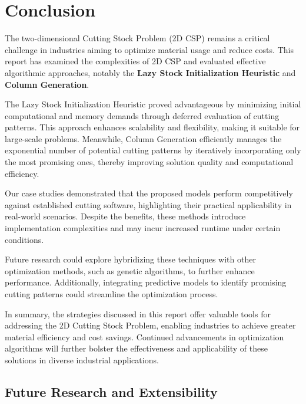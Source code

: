 \documentclass[a4paper]{article}
\begin{document}
\section{Conclusion}

The two-dimensional Cutting Stock Problem (2D CSP) remains a critical challenge in industries aiming to optimize material usage and reduce costs. This report has examined the complexities of 2D CSP and evaluated effective algorithmic approaches, notably the \textbf{Lazy Stock Initialization Heuristic} and \textbf{Column Generation}.

The Lazy Stock Initialization Heuristic proved advantageous by minimizing initial computational and memory demands through deferred evaluation of cutting patterns. This approach enhances scalability and flexibility, making it suitable for large-scale problems. Meanwhile, Column Generation efficiently manages the exponential number of potential cutting patterns by iteratively incorporating only the most promising ones, thereby improving solution quality and computational efficiency.

Our case studies demonstrated that the proposed models perform competitively against established cutting software, highlighting their practical applicability in real-world scenarios. Despite the benefits, these methods introduce implementation complexities and may incur increased runtime under certain conditions.

Future research could explore hybridizing these techniques with other optimization methods, such as genetic algorithms, to further enhance performance. Additionally, integrating predictive models to identify promising cutting patterns could streamline the optimization process.

In summary, the strategies discussed in this report offer valuable tools for addressing the 2D Cutting Stock Problem, enabling industries to achieve greater material efficiency and cost savings. Continued advancements in optimization algorithms will further bolster the effectiveness and applicability of these solutions in diverse industrial applications.
\subsection{Future Research and Extensibility}
\end{document}
